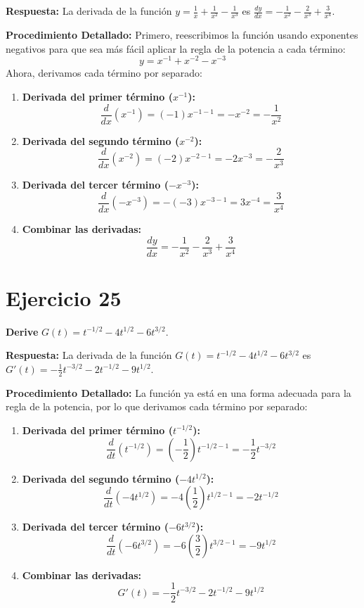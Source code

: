 \documentclass[12pt, a4paper]{article}
\begin{document}
\textbf{Respuesta:}
La derivada de la función $y=\frac{1}{x} + \frac{1}{x^2} - \frac{1}{x^3}$ es $\frac{dy}{dx} = -\frac{1}{x^2} - \frac{2}{x^3} + \frac{3}{x^4}$.

\textbf{Procedimiento Detallado:}
Primero, reescribimos la función usando exponentes negativos para que sea más fácil aplicar la regla de la potencia a cada término:
\[y=x^{-1} + x^{-2} - x^{-3}\]
Ahora, derivamos cada término por separado:
\begin{enumerate}
    \item \textbf{Derivada del primer término ($x^{-1}$):}
    \[\frac{d}{dx}(x^{-1}) = (-1)x^{-1-1}=-x^{-2}=-\frac{1}{x^2}\]
    \item \textbf{Derivada del segundo término ($x^{-2}$):}
    \[\frac{d}{dx}(x^{-2}) = (-2)x^{-2-1}=-2x^{-3}=-\frac{2}{x^3}\]
    \item \textbf{Derivada del tercer término ($-x^{-3}$):}
    \[\frac{d}{dx}(-x^{-3}) = -(-3)x^{-3-1}=3x^{-4}=\frac{3}{x^4}\]
    \item \textbf{Combinar las derivadas:}
    \[\frac{dy}{dx}=-\frac{1}{x^2}-\frac{2}{x^3}+\frac{3}{x^4}\]
\end{enumerate}

\section{Ejercicio 25}
\textbf{Derive} $G(t)=t^{-1/2} - 4t^{1/2} - 6t^{3/2}$.

\textbf{Respuesta:}
La derivada de la función $G(t)=t^{-1/2} - 4t^{1/2} - 6t^{3/2}$ es $G'(t)=-\frac{1}{2}t^{-3/2} - 2t^{-1/2} - 9t^{1/2}$.

\textbf{Procedimiento Detallado:}
La función ya está en una forma adecuada para la regla de la potencia, por lo que derivamos cada término por separado:
\begin{enumerate}
    \item \textbf{Derivada del primer término ($t^{-1/2}$):}
    \[\frac{d}{dt}(t^{-1/2})=\left(-\frac{1}{2}\right)t^{-1/2-1}=-\frac{1}{2}t^{-3/2}\]
    \item \textbf{Derivada del segundo término ($-4t^{1/2}$):}
    \[\frac{d}{dt}(-4t^{1/2})=-4\left(\frac{1}{2}\right)t^{1/2-1}=-2t^{-1/2}\]
    \item \textbf{Derivada del tercer término ($-6t^{3/2}$):}
    \[\frac{d}{dt}(-6t^{3/2})=-6\left(\frac{3}{2}\right)t^{3/2-1}=-9t^{1/2}\]
    \item \textbf{Combinar las derivadas:}
    \[G'(t)=-\frac{1}{2}t^{-3/2}-2t^{-1/2}-9t^{1/2}\]
\end{enumerate}
\end{document}
